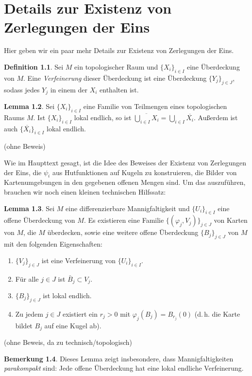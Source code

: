\documentclass[a4paper]{scrreprt}
\numberwithin{equation}{chapter}
\theoremstyle{definition}
\newtheorem{defn}{Definition}[section]
\newtheorem{lemma}[defn]{Lemma}
\newtheorem{bem}[defn]{Bemerkung}
\begin{document}
\chapter{Details zur Existenz von Zerlegungen der Eins}
\label{appendix:details_zerl_eins}
Hier geben wir ein paar mehr Details zur Existenz von Zerlegungen der Eins.
\begin{defn}
	Sei $M$ ein topologischer Raum und $\{X_i\}_{i\in I}$ eine Überdeckung von $M$. Eine \emph{Verfeinerung} dieser Überdeckung ist eine Überdeckung $\{Y_j\}_{j\in J}$, sodass jedes $Y_j$ in einem der $X_i$ enthalten ist.
\end{defn}
\begin{lemma} \label{lemma:lok_endl_abschluss}
	Sei $\{X_i\}_{i\in I}$ eine Familie von Teilmengen eines topologischen Raums $M$. Ist $\{X_i\}_{i\in I}$ lokal endlich, so ist $\overline{\bigcup_{i\in I} X_i} = \bigcup_{i\in I} \overline{X_i}$. Außerdem ist auch $\{\overline{X_i}\}_{i\in I}$ lokal endlich.

	(ohne Beweis)
\end{lemma}
Wie im Haupttext gesagt, ist die Idee des Beweises der Existenz von Zerlegungen der Eins, die $\psi_i$ aus Hutfunktionen auf Kugeln zu konstruieren, die Bilder von Kartenumgebungen in den gegebenen offenen Mengen sind. Um das auszuführen, brauchen wir noch einen kleinen technischen Hilfssatz:
\begin{lemma}
	Sei $M$ eine differenzierbare Mannigfaltigkeit und $\{U_i\}_{i\in I}$ eine offene Überdeckung von $M$. Es existieren eine Familie $\{(\varphi_j,V_j)\}_{j\in J}$ von Karten von $M$, die $M$ überdecken, sowie eine weitere offene Überdeckung $\{B_j\}_{j\in J}$ von $M$ mit den folgenden Eigenschaften:
	\begin{enumerate}[label=(\roman*)]
		\item $\{V_j\}_{j\in J}$ ist eine Verfeinerung von $\{U_i\}_{i\in I}$.
		\item Für alle $j\in J$ ist $\bar B_j \subset V_j$.
		\item $\{B_j\}_{j\in J}$ ist lokal endlich.
		\item Zu jedem $j\in J$ existiert ein $r_j > 0$ mit $\varphi_j(B_j) = B_{r_j}(0)$ (d.\,h. die Karte bildet $B_j$ auf eine Kugel ab).
	\end{enumerate}

	(ohne Beweis, da zu technisch/topologisch)
\end{lemma}
\begin{bem}
	Dieses Lemma zeigt insbesondere, dass Mannigfaltigkeiten \emph{parakompakt} sind: Jede offene Überdeckung hat eine lokal endliche Verfeinerung.
\end{bem}
\end{document}
